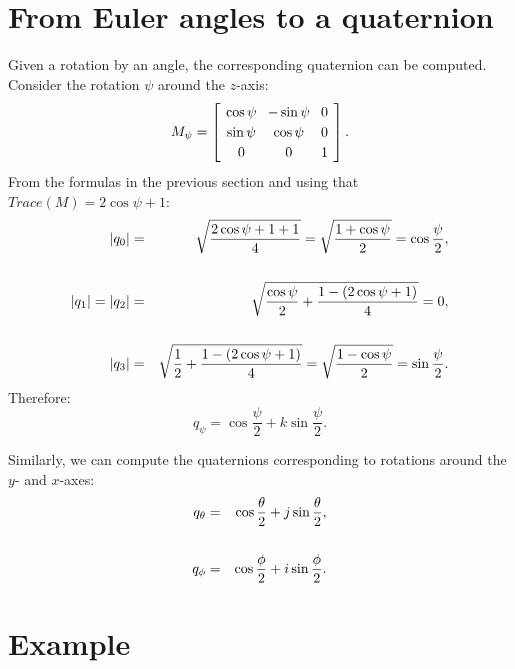 \documentclass[11pt,a4paper]{report}
\newcommand*{\spacearray}{
\renewcommand{\arraystretch}{1.2}
\setlength{\arraycolsep}{4pt}
}
\begin{document}

\section{From Euler angles to a quaternion}\label{s.atoq}

Given a rotation by an angle, the corresponding quaternion can be computed. Consider the rotation $\psi$ around the $z$-axis:
\begin{displaymath}
\spacearray
M_\psi=\left[
\begin{array}{ccc}
\cos\psi & -\sin\psi & 0\\
\sin\psi & \cos\psi & 0\\
0&0&1\\
\end{array}
\right].
\end{displaymath}
From the formulas in the previous section and using that $\textit{Trace}(M)=2\cos\psi+1$:
\begin{eqnarray*}
|q_0|&=&\sqrt{\frac{2\cos\psi+1+1}{4}}=\sqrt{\frac{1+\cos\psi}{2}}=\cos\frac{\psi}{2},\\
&\rule{0pt}{4pt}&\\
|q_1|=|q_2|&=&\sqrt{\frac{\cos\psi}{2}+\frac{1-(2\cos\psi+1)}{4}}=0,\\
&\rule{0pt}{4pt}&\\
|q_3|&=&\sqrt{\frac{1}{2}+\frac{1-(2\cos\psi+1)}{4}}=\sqrt{\frac{1-\cos\psi}{2}}=\sin\frac{\psi}{2}.
\end{eqnarray*}
Therefore:
\begin{displaymath}
q_\psi=\cos\frac{\psi}{2} + k\sin\frac{\psi}{2}.
\end{displaymath}

Similarly, we can compute the quaternions corresponding to rotations around the $y$- and $x$-axes:
\begin{eqnarray*}
q_\theta&=&\cos\frac{\theta}{2} + j\sin\frac{\theta}{2},\\
&\rule{0pt}{4pt}&\\
q_\phi&=&\cos\frac{\phi}{2} + i\sin\frac{\phi}{2}.
\end{eqnarray*}


\section{Example}
\end{document}
